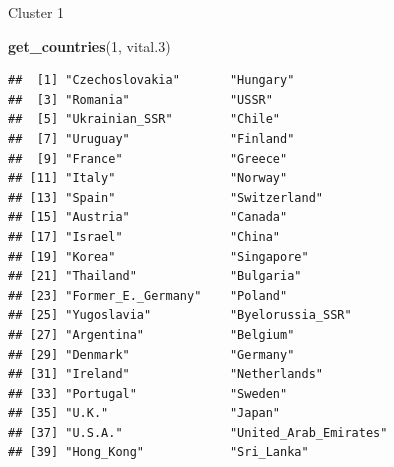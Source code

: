 \documentclass[ignorenonframetext,]{beamer}
\newenvironment{Shaded}{\begin{snugshade}}{\end{snugshade}}
\newcommand{\DecValTok}[1]{\textcolor[rgb]{0.00,0.00,0.81}{#1}}
\newcommand{\FloatTok}[1]{\textcolor[rgb]{0.00,0.00,0.81}{#1}}
\newcommand{\KeywordTok}[1]{\textcolor[rgb]{0.13,0.29,0.53}{\textbf{#1}}}
\newcommand{\NormalTok}[1]{#1}
\begin{document}
\begin{frame}[fragile]{Cluster 1}
\protect\hypertarget{cluster-1}{}

\begin{Shaded}
\begin{Highlighting}[]
\KeywordTok{get_countries}\NormalTok{(}\DecValTok{1}\NormalTok{, vital}\FloatTok{.3}\NormalTok{)}
\end{Highlighting}
\end{Shaded}

\begin{verbatim}
##  [1] "Czechoslovakia"       "Hungary"             
##  [3] "Romania"              "USSR"                
##  [5] "Ukrainian_SSR"        "Chile"               
##  [7] "Uruguay"              "Finland"             
##  [9] "France"               "Greece"              
## [11] "Italy"                "Norway"              
## [13] "Spain"                "Switzerland"         
## [15] "Austria"              "Canada"              
## [17] "Israel"               "China"               
## [19] "Korea"                "Singapore"           
## [21] "Thailand"             "Bulgaria"            
## [23] "Former_E._Germany"    "Poland"              
## [25] "Yugoslavia"           "Byelorussia_SSR"     
## [27] "Argentina"            "Belgium"             
## [29] "Denmark"              "Germany"             
## [31] "Ireland"              "Netherlands"         
## [33] "Portugal"             "Sweden"              
## [35] "U.K."                 "Japan"               
## [37] "U.S.A."               "United_Arab_Emirates"
## [39] "Hong_Kong"            "Sri_Lanka"
\end{verbatim}

\end{frame}
\end{document}
